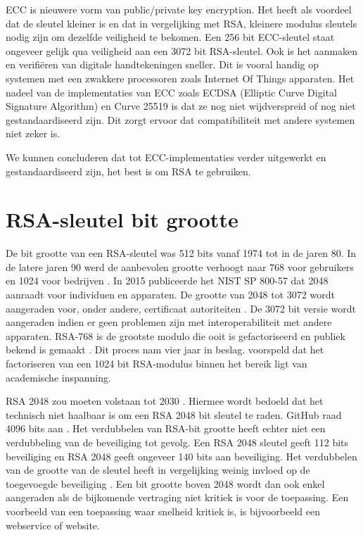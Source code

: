 ECC is nieuwere vorm van public/private key encryption. Het heeft als voordeel
dat de sleutel kleiner is en dat in vergelijking met RSA, kleinere modulus
sleutels nodig zijn om dezelfde veiligheid te bekomen. Een 256 bit ECC-sleutel
staat ongeveer gelijk qua veiligheid aan een 3072 bit RSA-sleutel. Ook is het
aanmaken en verifiëren van digitale handtekeningen sneller.
\autocite{HighSpeedHighSecuritySignatures} Dit is vooral handig op systemen met
een zwakkere processoren zoals Internet Of Things apparaten. Het nadeel van de
implementaties van ECC zoals ECDSA (Elliptic Curve Digital Signature Algorithm)
en Curve 25519 is dat ze nog niet wijdverspreid of nog niet gestandaardiseerd
zijn. Dit zorgt ervoor dat compatibiliteit met andere systemen niet zeker is.

We kunnen concluderen dat tot ECC-implementaties verder uitgewerkt en
gestandaardiseerd zijn, het best is om RSA te gebruiken.

\section{RSA-sleutel bit grootte}
\label{sec:rsa-sleutel-bit-grootte}

De bit grootte van een RSA-sleutel was 512 bits vanaf 1974 tot in de jaren 80.
In de latere jaren 90 werd de aanbevolen grootte verhoogt naar 768 voor
gebruikers en 1024 voor bedrijven \autocite{OriginalRSAKeySizeRecommendations}.
In 2015 publiceerde het \acrshort{NIST} SP 800-57 dat 2048 aanraadt voor
individuen en
apparaten. De grootte van 2048 tot 3072 wordt aangeraden voor, onder andere,
certificaat autoriteiten
\autocite{NISTKeyManagementRecommendationApplicationSpecific}. De 3072 bit
versie wordt aangeraden indien er geen problemen zijn met interoperabiliteit met
andere apparaten. RSA-768 is de grootste modulo die ooit is gefactoriseerd en
publiek bekend is gemaakt \autocite{FactorizationOf768BitRSA}. Dit proces nam
vier jaar in beslag. \textcite{FactorizationOf768BitRSA} voorspeld dat het
factoriseren van een 1024 bit RSA-modulus binnen het bereik ligt van academische
inspanning.

RSA 2048 zou moeten volstaan tot 2030
\autocite{NISTKeyManagementRecommendationGeneral, NISTAlgorithmesAndKeyLengths}.
Hiermee wordt bedoeld dat het technisch niet haalbaar is om een RSA 2048 bit
sleutel te raden. GitHub raad 4096 bits aan
\autocite{GithubGeneratingANewGPGKey}. Het verdubbelen van RSA-bit grootte heeft
echter niet een verdubbeling van de beveiliging tot gevolg. Een RSA 2048 sleutel
geeft 112 bits beveiliging en RSA 2048 geeft ongeveer 140 bits aan beveiliging.
Het verdubbelen van de grootte van de sleutel heeft in vergelijking weinig
invloed op de toegevoegde beveiliging \autocite{GnuPGFAQ}. Een bit grootte boven
2048 wordt dan ook enkel aangeraden als de bijkomende vertraging niet kritiek is
voor de toepassing. Een voorbeeld van een toepassing waar snelheid kritiek is,
is bijvoorbeeld een webservice of website.

